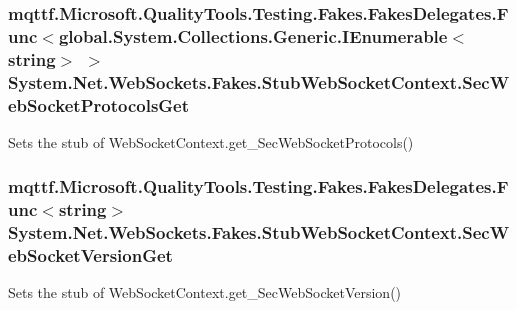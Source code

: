 \hypertarget{class_system_1_1_net_1_1_web_sockets_1_1_fakes_1_1_stub_web_socket_context_a1bd4d812af052e0df80d2ea73e6629f4}{
\subsubsection[{Sec\-Web\-Socket\-Protocols\-Get}]{\setlength{\rightskip}{0pt plus 5cm}mqttf.\-Microsoft.\-Quality\-Tools.\-Testing.\-Fakes.\-Fakes\-Delegates.\-Func$<$global.\-System.\-Collections.\-Generic.\-I\-Enumerable$<$string$>$ $>$ System.\-Net.\-Web\-Sockets.\-Fakes.\-Stub\-Web\-Socket\-Context.\-Sec\-Web\-Socket\-Protocols\-Get}}\label{class_system_1_1_net_1_1_web_sockets_1_1_fakes_1_1_stub_web_socket_context_a1bd4d812af052e0df80d2ea73e6629f4}


Sets the stub of Web\-Socket\-Context.\-get\-\_\-\-Sec\-Web\-Socket\-Protocols()

\hypertarget{class_system_1_1_net_1_1_web_sockets_1_1_fakes_1_1_stub_web_socket_context_a0c3d704d8bd974fb304f3792937b661a}{
\subsubsection[{Sec\-Web\-Socket\-Version\-Get}]{\setlength{\rightskip}{0pt plus 5cm}mqttf.\-Microsoft.\-Quality\-Tools.\-Testing.\-Fakes.\-Fakes\-Delegates.\-Func$<$string$>$ System.\-Net.\-Web\-Sockets.\-Fakes.\-Stub\-Web\-Socket\-Context.\-Sec\-Web\-Socket\-Version\-Get}}\label{class_system_1_1_net_1_1_web_sockets_1_1_fakes_1_1_stub_web_socket_context_a0c3d704d8bd974fb304f3792937b661a}


Sets the stub of Web\-Socket\-Context.\-get\-\_\-\-Sec\-Web\-Socket\-Version()

